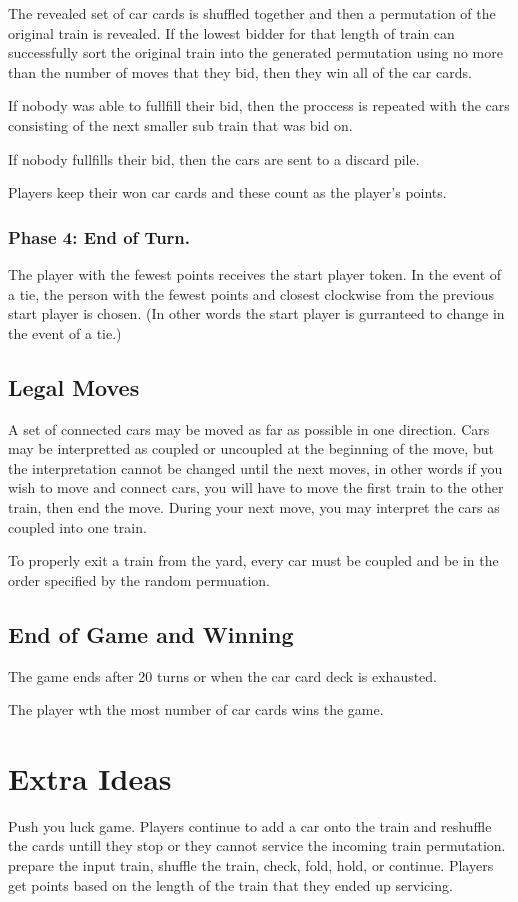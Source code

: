 \documentclass[12pt, letterpaper]{article}
\begin{document}
The revealed set of car cards is shuffled together and then a permutation of the original train is revealed. If the lowest bidder for that length of train can successfully sort the original train into the generated permutation using no more than the number of moves that they bid, then they win all of the car cards.

If nobody was able to fullfill their bid, then the proccess is repeated with the cars consisting of the next smaller sub train that was bid on.

If nobody fullfills their bid, then the cars are sent to a discard pile.

Players keep their won car cards and these count as the player's points.

\subsubsection{Phase 4: End of Turn.}

The player with the fewest points receives the start player token. In the event of a tie, the person with the fewest points and closest clockwise from the previous start player is chosen. (In other words the start player is gurranteed to change in the event of a tie.)

\subsection{Legal Moves}

A set of connected cars may be moved as far as possible in one direction. Cars may be interpretted as coupled or uncoupled at the beginning of the move, but the interpretation cannot be changed until the next moves, in other words if you wish to move and connect cars, you will have to move the first train to the other train, then end the move. During your next move, you may interpret the cars as coupled into one train.

To properly exit a train from the yard, every car must be coupled and be in the order specified by the random permuation.

\subsection{End of Game and Winning}

The game ends after 20 turns or when the car card deck is exhausted.

The player wth the most number of car cards wins the game.

\section{Extra Ideas}

Push you luck game. Players continue to add a car onto the train and reshuffle the cards untill they stop or they cannot service the incoming train permutation. prepare the input train, shuffle the train, check, fold, hold, or continue. Players get points based on the length of the train that they ended up servicing.

\end{document}
